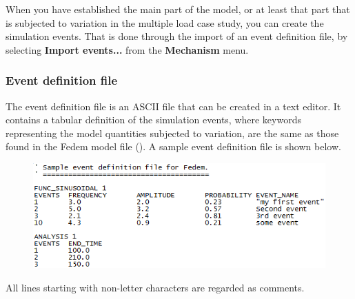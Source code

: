 {

When you have established the main part of the model, or at least that part that
is subjected to variation in the multiple load case study, you can create the
simulation events. That is done through the import of an event definition file,
by selecting \textbf{Import events...} from the \textbf{Mechanism} menu.

\subsubsection{Event definition file}

The event definition file is an ASCII file that can be created in a text editor.
It contains a tabular definition of the simulation events, where keywords
representing the model quantities subjected to variation, are the same as those
found in the Fedem model file ().
A sample event definition file is shown below.

\begin{figure}[!h]
  \includegraphics[width=\textwidth]{Figures/6-EventDefSample}
\end{figure}

\noindent
All lines starting with non-letter characters are regarded as comments.

}
